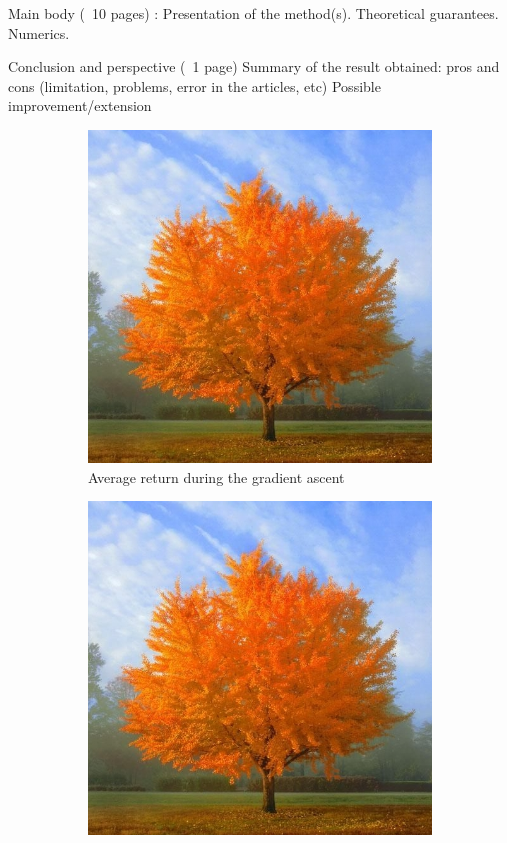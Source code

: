 \documentclass[a4paper, 11pt]{scrartcl}
\begin{document}
Main body (~10 pages) : 
Presentation of the method(s). 
Theoretical guarantees. 
Numerics. 

Conclusion and perspective (~1 page)
Summary of the result obtained: pros and cons (limitation, problems, error in the articles, etc)
Possible improvement/extension

\newpage




 
\begin{figure}[h]
\centering
\begin{subfigure}{.5\textwidth}
  \centering
  \includegraphics[width=\linewidth]{tree.jpg}
  \caption{Average return during the gradient ascent}
  \label{fig:sub3}
\end{subfigure}%
\begin{subfigure}{.5\textwidth}
  \centering
  \includegraphics[width=\linewidth]{tree.jpg}

\end{subfigure}
\end{figure}
\end{document}
